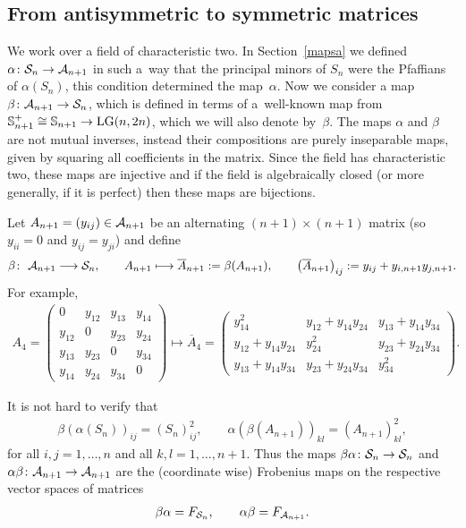 \documentclass[pdftex]{sigma}
\newcommand{\bS}{{\mathbb S}}
\newcommand{\cA}{{\cal A}}
\newcommand{\cS}{{\cal S}}
\numberwithin{equation}{section}
\begin{document}
\subsection{From antisymmetric to symmetric matrices}\label{mapas}
  We work over a field of characteristic two. In Section~\ref{mapsa} we defined $\alpha\colon \cS_n\rightarrow\cA_{n+1}$ in such a~way that the principal minors of $S_n$ were the Pfaffians of $\alpha(S_n)$, this condition determined the map~$\alpha$. Now we consider a map $\beta\colon \cA_{n+1}\rightarrow\cS_{n}$, which is defined in terms of a~well-known map from $\bS_{n+1}^+\cong\bS_{n+1}\rightarrow {\rm LG}(n,2n)$, which we will also denote by~$\beta$. The maps $\alpha$ and $\beta$ are not mutual inverses, instead their compositions are purely inseparable maps, given by squaring all coefficients in the matrix. Since the field has characteristic two, these maps are injective and if the field is algebraically closed (or more generally, if it is perfect) then these maps are bijections.

Let $A_{n+1}=(y_{ij})\in\cA_{n+1}$ be an alternating $(n+1)\times(n+1)$ matrix (so $y_{ii}=0$ and $y_{ij}=y_{ji}$) and define
\begin{gather*}
\beta\colon \ \cA_{n+1} \longrightarrow \cS_n,\qquad A_{n+1}\longmapsto \overline{A}_{n+1}:=\beta(A_{n+1}),\qquad
\big(\overline{A}_{n+1}\big)_{ij} := y_{ij} + y_{i,n+1}y_{j,n+1}.
\end{gather*}
For example,
\begin{gather*}
A_{4} = \begin{pmatrix}
 0&y_{12}&y_{13}&y_{14}\\
 y_{12}&0&y_{23}&y_{24}\\
 y_{13}&y_{23}&0&y_{34}\\
 y_{14}&y_{24}&y_{34}&0
 \end{pmatrix}
 \longmapsto
\overline{A}_4 =
\begin{pmatrix}
y_{14}^2&y_{12}+y_{14}y_{24}&y_{13}+y_{14}y_{34}\\
y_{12}+y_{14}y_{24}&y_{24}^2&y_{23}+y_{24}y_{34}\\
y_{13}+y_{14}y_{34}&y_{23}+y_{24}y_{34}&y_{34}^2
\end{pmatrix}.
\end{gather*}


It is not hard to verify that
\begin{gather*}
\beta(\alpha(S_n))_{ij} = (S_n)_{ij}^2,\qquad
\alpha(\beta(A_{n+1}))_{kl} = (A_{n+1})_{kl}^2,
\end{gather*}
for all $i,j=1, \ldots,n$ and all $k,l=1,\ldots,n+1$. Thus the maps $\beta\alpha\colon\allowbreak \cS_n\rightarrow \cS_n$ and $\alpha\beta\colon \cA_{n+1}\rightarrow \cA_{n+1}$ are the (coordinate wise) Frobenius maps on the respective vector spaces of matrices
\begin{gather*}
\beta\alpha = F_{\cS_n},\qquad \alpha\beta = F_{\cA_{n+1}}.
\end{gather*}
\end{document}
